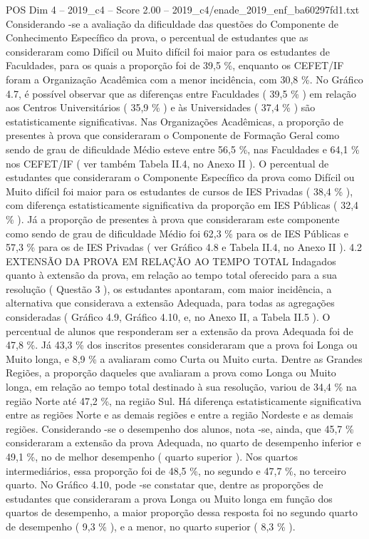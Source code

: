 \begin{textsample}{POS Dim 4 – 2019\_c4 – Score 2.00 – 2019\_c4/enade\_2019\_enf\_ba60297fd1.txt}
Considerando -se a avaliação da dificuldade das questões do Componente de Conhecimento Específico da prova, o percentual de estudantes que as consideraram como Difícil ou Muito difícil foi maior para os estudantes de Faculdades, para os quais a proporção foi de 39,5 \%, enquanto os CEFET/IF foram a Organização Acadêmica com a menor incidência, com 30,8 \%.
No Gráfico 4.7, é possível observar que as diferenças entre Faculdades ( 39,5 \% ) em relação aos Centros Universitários ( 35,9 \% ) e às Universidades ( 37,4 \% ) são estatisticamente significativas.
Nas Organizações Acadêmicas, a proporção de presentes à prova que consideraram o Componente de Formação Geral como sendo de grau de dificuldade Médio esteve entre 56,5 \%, nas Faculdades e 64,1 \% nos CEFET/IF ( ver também Tabela II.4, no Anexo II ).
O percentual de estudantes que consideraram o Componente Específico da prova como Difícil ou Muito difícil foi maior para os estudantes de cursos de IES Privadas ( 38,4 \% ), com diferença estatisticamente significativa da proporção em IES Públicas ( 32,4 \% ).
Já a proporção de presentes à prova que consideraram este componente como sendo de grau de dificuldade Médio foi 62,3 \% para os de IES Públicas e 57,3 \% para os de IES Privadas ( ver Gráfico 4.8 e Tabela II.4, no Anexo II ). 4.2 EXTENSÃO DA PROVA EM RELAÇÃO AO TEMPO TOTAL Indagados quanto à extensão da prova, em relação ao tempo total oferecido para a sua resolução ( Questão 3 ), os estudantes apontaram, com maior incidência, a alternativa que considerava a extensão Adequada, para todas as agregações consideradas ( Gráfico 4.9, Gráfico 4.10, e, no Anexo II, a Tabela II.5 ).
O percentual de alunos que responderam ser a extensão da prova Adequada foi de 47,8 \%.
Já 43,3 \% dos inscritos presentes consideraram que a prova foi Longa ou Muito longa, e 8,9 \% a avaliaram como Curta ou Muito curta.
Dentre as Grandes Regiões, a proporção daqueles que avaliaram a prova como Longa ou Muito longa, em relação ao tempo total destinado à sua resolução, variou de 34,4 \% na região Norte até 47,2 \%, na região Sul.
Há diferença estatisticamente significativa entre as regiões Norte e as demais regiões e entre a região Nordeste e as demais regiões.
Considerando -se o desempenho dos alunos, nota -se, ainda, que 45,7 \% consideraram a extensão da prova Adequada, no quarto de desempenho inferior e 49,1 \%, no de melhor desempenho ( quarto superior ).
Nos quartos intermediários, essa proporção foi de 48,5 \%, no segundo e 47,7 \%, no terceiro quarto.
No Gráfico 4.10, pode -se constatar que, dentre as proporções de estudantes que consideraram a prova Longa ou Muito longa em função dos quartos de desempenho, a maior proporção dessa resposta foi no segundo quarto de desempenho ( 9,3 \% ), e a menor, no quarto superior ( 8,3 \% ).

\end{textsample}

